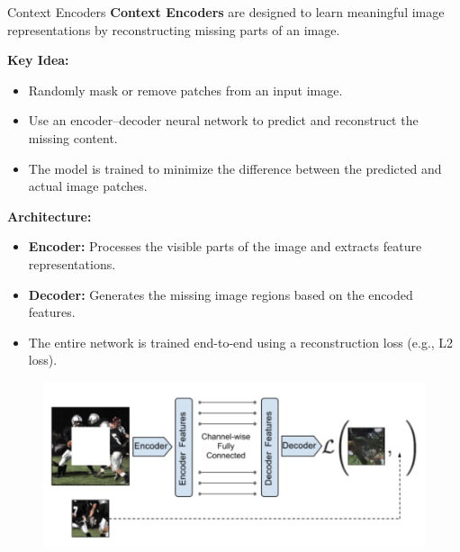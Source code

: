 \begin{frame}[allowframebreaks]{Context Encoders}
    \textbf{Context Encoders} are designed to learn meaningful image representations by reconstructing missing parts of an image.

    \vspace{0.15em}
    \textbf{Key Idea:}
    \begin{itemize}
        \setlength{\itemsep}{-0.5em}
        \item Randomly mask or remove patches from an input image.
        \item Use an encoder–decoder neural network to predict and reconstruct the missing content.
        \item The model is trained to minimize the difference between the predicted and actual image patches.
    \end{itemize}

    \vspace{0.15em}
    \textbf{Architecture:}
    \begin{itemize}
        \setlength{\itemsep}{-0.5em}
        \item \textbf{Encoder:} Processes the visible parts of the image and extracts feature representations.
        \item \textbf{Decoder:} Generates the missing image regions based on the encoded features.
        \item The entire network is trained end-to-end using a reconstruction loss (e.g., L2 loss).
    \end{itemize}

    \framebreak

    \begin{figure}
        \flushleft
        \includegraphics[width=1\linewidth,height=\textheight,keepaspectratio]{images/ssl/slide_18_1_img.png}
    \end{figure}

    \framebreak


\end{frame}

